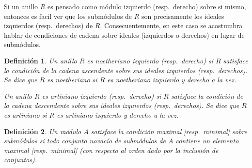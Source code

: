\documentclass{report}
\newtheorem{definition}{Definición}
\begin{document}
  Si un anillo \(R\) es pensado como módulo izquierdo (resp.\ derecho) sobre si mismo, entonces es facil ver que los submódulos de \(R\) son precisamente los ideales izquierdos (resp.\ derechos) de \(R\).
  Consecuentemente, en este caso se acostumbra hablar de condiciones de cadena sobre ideales (izquierdos o derechos) en lugar de submódulos.

  \begin{definition}
    Un anillo \(R\) es \emph{noetheriano izquierdo} (resp.\ \emph{derecho}) si \(R\) satisface la condición de la cadena ascendente sobre sus ideales izquierdos (resp.\ derechos).
    Se dice que \(R\) es \emph{noetheriano} si \(R\) es noetheriano izquierdo y derecho a la vez.

    Un anillo \(R\) es \emph{artiniano izquierdo} (resp.\ \emph{derecho}) si \(R\) satisface la condición de la cadena descendente sobre sus ideales izquierdos (resp.\ derechos).
    Se dice que \(R\) es \emph{artiniano} si \(R\) es artiniano izquierdo y derecho a la vez.
  \end{definition}

  \begin{definition}
    Un módulo \(A\) satisface la \emph{condición maximal} [resp.\ \emph{minimal}] \emph{sobre submódulos} si todo conjunto novacío de submódulos de \(A\) contiene un elemento maximal [resp.\ minimal] (con respecto al orden dado por la inclusión de conjuntos).
  \end{definition}
\end{document}
